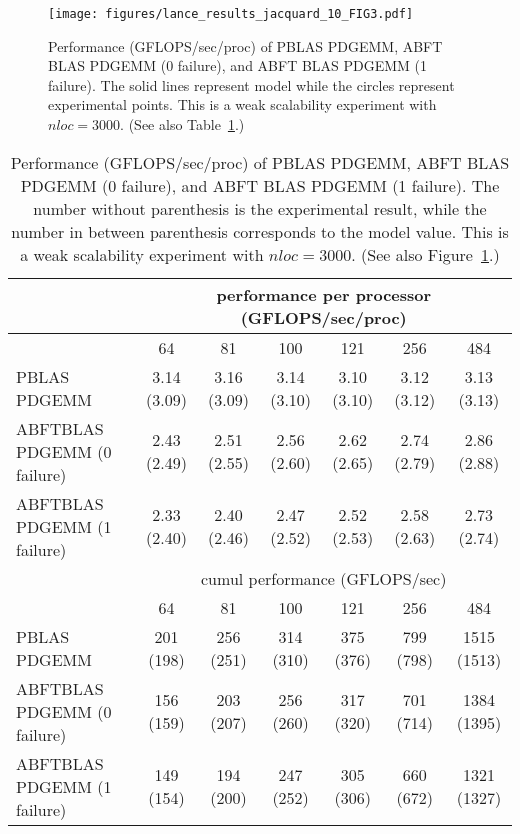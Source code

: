 \documentclass[pdftex,11pt]{article}
\begin{document}
\begin{figure}
  \begin{center}
    \texttt{[image: figures/lance\_results\_jacquard\_10\_FIG3.pdf]}
  \end{center}
  \color{DodgerBlue4}
  \caption{\label{fig:perf02} \color{black} Performance
    (GFLOPS/sec/proc) of PBLAS PDGEMM, ABFT BLAS PDGEMM (0 failure),
    and ABFT BLAS PDGEMM (1 failure).  The solid lines represent model
    while the circles represent experimental points.  This is a weak
    scalability experiment with $nloc=3000$.  (See also
    Table~\ref{tab:perf02}.)  }
\end{figure}

\begin{table}
  \begin{center}
    \small
    \begin{tabular}{|l||c|c|c|c|c|c|}
      \hline
      & \multicolumn{6}{|c|}{performance per processor (GFLOPS/sec/proc)}\\
      \hline
      &   64        &   81        &  100        &  121        &  256        &  484        \\
      \hline
      PBLAS PDGEMM                & 3.14 (3.09) & 3.16 (3.09) & 3.14 (3.10) & 3.10 (3.10) & 3.12 (3.12) & 3.13 (3.13) \\
      ABFTBLAS PDGEMM (0 failure) & 2.43 (2.49) & 2.51 (2.55) & 2.56 (2.60) & 2.62 (2.65) & 2.74 (2.79) & 2.86 (2.88) \\
      ABFTBLAS PDGEMM (1 failure) & 2.33 (2.40) & 2.40 (2.46) & 2.47 (2.52) & 2.52 (2.53) & 2.58 (2.63) & 2.73 (2.74) \\
      \hline
      & \multicolumn{6}{|c|}{cumul performance (GFLOPS/sec)}\\
      \hline
      &   64        &   81        &  100        &  121        &  256        &  484        \\
      \hline
      PBLAS PDGEMM                &  201 (198)  &  256 (251)  &  314 (310)  &  375 (376)  &  799 (798)  & 1515 (1513) \\
      ABFTBLAS PDGEMM (0 failure) &  156 (159)  &  203 (207)  &  256 (260)  &  317 (320)  &  701 (714)  & 1384 (1395) \\
      ABFTBLAS PDGEMM (1 failure) &  149 (154)  &  194 (200)  &  247 (252)  &  305 (306)  &  660 (672)  & 1321 (1327) \\
      \hline
    \end{tabular}
    \normalsize
  \end{center}
  \color{DodgerBlue4}
  \caption{\label{tab:perf02}
    \color{black}
    Performance (GFLOPS/sec/proc) of PBLAS PDGEMM, ABFT BLAS PDGEMM (0 failure), 
    and ABFT BLAS PDGEMM (1 failure). The number without parenthesis is the experimental result, 
    while the number in between parenthesis corresponds to the model value.
    This is a weak scalability experiment with $nloc=3000$.
    (See also Figure~\ref{fig:perf02}.)
  }
\end{table}
\end{document}
